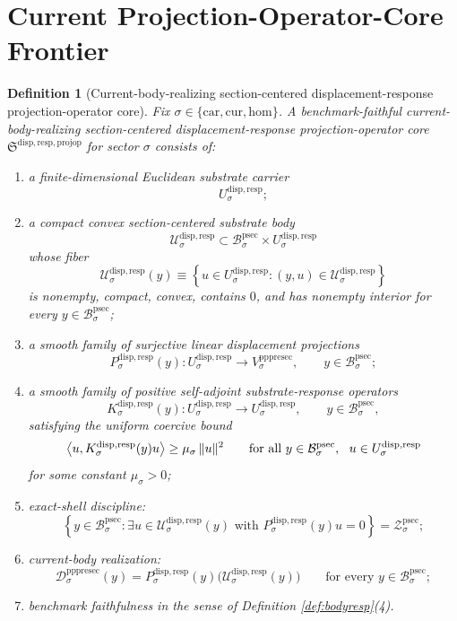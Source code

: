 \documentclass[11pt]{article}
\newcommand{\Car}{\mathrm{car}}
\newcommand{\Cur}{\mathrm{cur}}
\newcommand{\Hom}{\mathrm{hom}}
\newcommand{\ProtoSectionBody}[1]{\mathcal B_{#1}^{\mathrm{psec}}}
\newcommand{\ProtoSectionShell}[1]{\mathcal Z_{#1}^{\mathrm{psec}}}
\newcommand{\PrePreProtoSectionVertical}[1]{V_{#1}^{\mathrm{pppresec}}}
\newcommand{\PrePreProtoSectionResidualBody}[1]{\mathcal D_{#1}^{\mathrm{pppresec}}}
\newcommand{\ProjectionOperatorCore}{\mathfrak S^{\mathrm{disp,resp,projop}}}
\newcommand{\SubstrateCarrier}[1]{U_{#1}^{\mathrm{disp,resp}}}
\newcommand{\SubstrateBody}[1]{\mathcal U_{#1}^{\mathrm{disp,resp}}}
\newcommand{\SubstrateProjection}[1]{P_{#1}^{\mathrm{disp,resp}}}
\newcommand{\SubstrateOperator}[1]{K_{#1}^{\mathrm{disp,resp}}}
\newtheorem{definition}{Definition}
\begin{document}
\section{Current Projection-Operator-Core Frontier}

\begin{definition}[Current-body-realizing section-centered displacement-response projection-operator core]
\label{def:core}
Fix \(\sigma\in\{\Car,\Cur,\Hom\}\). A \emph{benchmark-faithful current-body-realizing section-centered displacement-response projection-operator core} \(\ProjectionOperatorCore\) for sector \(\sigma\) consists of:
\begin{enumerate}
    \item a finite-dimensional Euclidean substrate carrier
    \[
    \SubstrateCarrier{\sigma};
    \]
    \item a compact convex section-centered substrate body
    \[
    \SubstrateBody{\sigma}
    \subset
    \ProtoSectionBody{\sigma}\times\SubstrateCarrier{\sigma}
    \]
    whose fiber
    \[
    \SubstrateBody{\sigma}(y)
    \equiv
    \left\{
    u\in\SubstrateCarrier{\sigma}:(y,u)\in\SubstrateBody{\sigma}
    \right\}
    \]
    is nonempty, compact, convex, contains \(0\), and has nonempty interior for every \(y\in\ProtoSectionBody{\sigma}\);
    \item a smooth family of surjective linear displacement projections
    \[
    \SubstrateProjection{\sigma}(y):
    \SubstrateCarrier{\sigma}\to\PrePreProtoSectionVertical{\sigma},
    \qquad
    y\in\ProtoSectionBody{\sigma};
    \]
    \item a smooth family of positive self-adjoint substrate-response operators
    \[
    \SubstrateOperator{\sigma}(y):
    \SubstrateCarrier{\sigma}\to\SubstrateCarrier{\sigma},
    \qquad
    y\in\ProtoSectionBody{\sigma},
    \]
    satisfying the uniform coercive bound
    \begin{equation}
    \ev{u,\SubstrateOperator{\sigma}(y)u}
    \ge
    \mu_{\sigma}\,\|u\|^{2}
    \qquad
    \text{for all }
    y\in\ProtoSectionBody{\sigma},
    \ \ u\in\SubstrateCarrier{\sigma}
    \label{eq:coercive}
    \end{equation}
    for some constant \(\mu_{\sigma}>0\);
    \item exact-shell discipline:
    \[
    \left\{
    y\in\ProtoSectionBody{\sigma}:
    \exists u\in\SubstrateBody{\sigma}(y)
    \text{ with }
    \SubstrateProjection{\sigma}(y)u=0
    \right\}
    =
    \ProtoSectionShell{\sigma};
    \]
    \item current-body realization:
    \begin{equation}
    \PrePreProtoSectionResidualBody{\sigma}(y)
    =
    \SubstrateProjection{\sigma}(y)\bigl(\SubstrateBody{\sigma}(y)\bigr)
    \qquad
    \text{for every }
    y\in\ProtoSectionBody{\sigma};
    \label{eq:realizing}
    \end{equation}
    \item benchmark faithfulness in the sense of Definition \ref{def:bodyresp}(4).
\end{enumerate}
\end{definition}
\end{document}
